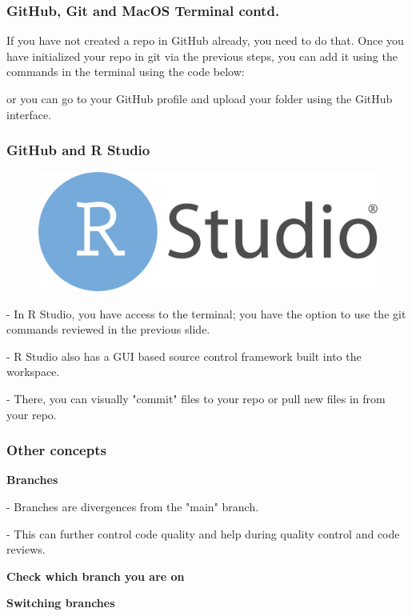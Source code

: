 \documentclass{beamer}
\begin{document}
\begin{frame}
\frametitle{GitHub, Git and MacOS Terminal contd.}

If you have not created a repo in GitHub already, you need to do that. Once you have initialized your repo in git via the previous steps, you can add it using the commands in the terminal using the code below:


or you can go to your GitHub profile and upload your folder using the GitHub interface.

\end{frame}

\begin{frame}
\frametitle{GitHub and R Studio}

\begin{figure}[t]
\includegraphics[scale=0.05]{images/RStudio-Logo-Flat.png}
\end{figure}

- In R Studio, you have access to the terminal; you have the option to use the git commands reviewed in the previous slide. 

- R Studio also has a GUI based source control framework built into the workspace. 

\hspace{10mm} - There, you can visually "commit" files to your repo or pull new files in from your repo.

\end{frame}

\begin{frame}
\frametitle{Other concepts}

\textbf{Branches}

\hspace{10mm} - Branches are divergences from the "main" branch.

\hspace{10mm} - This can further control code quality and help during quality control and code reviews.

\textbf{Check which branch you are on}

\hspace{10mm} 

\textbf{Switching branches}

\hspace{10mm} 

\end{frame}
\end{document}
